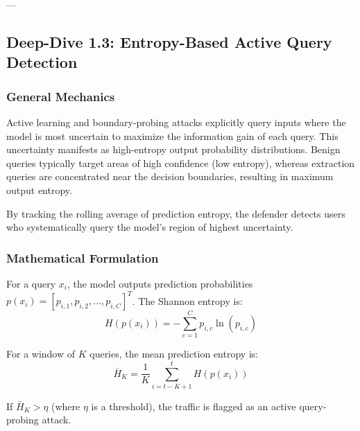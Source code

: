 \documentclass{article}
\begin{document}
---

\subsection{Deep-Dive 1.3: Entropy-Based Active Query Detection}

\subsubsection{General Mechanics}
Active learning and boundary-probing attacks explicitly query inputs where the model is most uncertain to maximize the information gain of each query. This uncertainty manifests as high-entropy output probability distributions. Benign queries typically target areas of high confidence (low entropy), whereas extraction queries are concentrated near the decision boundaries, resulting in maximum output entropy. 

By tracking the rolling average of prediction entropy, the defender detects users who systematically query the model's region of highest uncertainty.

\subsubsection{Mathematical Formulation}
For a query $x_i$, the model outputs prediction probabilities $p(x_i) = [p_{i,1}, p_{i,2}, \dots, p_{i,C}]^T$. The Shannon entropy is:
\begin{equation}
    H(p(x_i)) = - \sum_{c=1}^C p_{i,c} \ln\left( p_{i,c} \right)
\end{equation}

For a window of $K$ queries, the mean prediction entropy is:
\begin{equation}
    \bar{H}_K = \frac{1}{K} \sum_{i=t-K+1}^t H(p(x_i))
\end{equation}

If $\bar{H}_K > \eta$ (where $\eta$ is a threshold), the traffic is flagged as an active query-probing attack.
\end{document}
